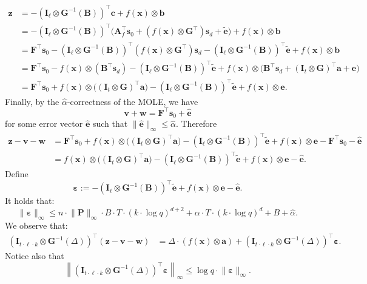 \documentclass{article}
\newcommand{\id}{\ensuremath{\mathbf{I}}}
\begin{document}
\begin{align*}
\mathbf{z}
&=-(\id_\ell\otimes \mathbf{G}^{-1}(\mathbf{B}))^\intercal \mathbf{c}+f(\mathbf{x})\otimes \mathbf{b}\\
&=-(\id_\ell\otimes \mathbf{G}^{-1}(\mathbf{B}))^\intercal
\bigl(\mathbf{A}_f^\intercal \mathbf{s}_0+(f(\mathbf{x})\otimes \mathbf{G}^\intercal)\mathbf{s}_d+\widetilde{\mathbf e}\bigr)
+f(\mathbf{x})\otimes \mathbf{b}\\
&=\mathbf{F}^\intercal \mathbf{s}_0
-(\id_\ell\otimes \mathbf{G}^{-1}(\mathbf{B}))^\intercal (f(\mathbf{x})\otimes \mathbf{G}^\intercal)\mathbf{s}_d
-(\id_\ell\otimes \mathbf{G}^{-1}(\mathbf{B}))^\intercal \widetilde{\mathbf e}
+f(\mathbf{x})\otimes \mathbf{b}\\
&=\mathbf{F}^\intercal \mathbf{s}_0
-f(\mathbf{x})\otimes (\mathbf{B}^\intercal \mathbf{s}_d)
-(\id_\ell\otimes \mathbf{G}^{-1}(\mathbf{B}))^\intercal \widetilde{\mathbf e}
+f(\mathbf{x})\otimes
\bigl(\mathbf{B}^\intercal \mathbf{s}_d+(\id_t\otimes \mathbf{G})^\intercal\mathbf{a}+\mathbf e\bigr)\\
&=\mathbf{F}^\intercal \mathbf{s}_0
+f(\mathbf{x})\otimes\bigl((\id_t\otimes \mathbf{G})^\intercal\mathbf a\bigr)
-(\id_\ell\otimes \mathbf{G}^{-1}(\mathbf{B}))^\intercal \widetilde{\mathbf e}
+f(\mathbf{x})\otimes \mathbf e.
\end{align*}
    Finally, by the $\hat{\alpha}$-correctness of the MOLE, we have
\[
\mathbf{v}+\mathbf{w}=\mathbf{F}^\intercal\mathbf{s}_0+\widehat{\mathbf e}
\]
for some error vector $\widehat{\mathbf e}$ such that $\lVert \widehat{\mathbf e}\rVert_\infty\le \hat{\alpha}$. Therefore
\begin{align*}
\mathbf{z}-\mathbf{v}-\mathbf{w}
&=\mathbf{F}^\intercal \mathbf{s}_0
+f(\mathbf{x})\otimes\bigl((\id_t\otimes \mathbf{G})^\intercal\mathbf a\bigr)
-(\id_\ell\otimes \mathbf{G}^{-1}(\mathbf{B}))^\intercal \widetilde{\mathbf e}
+f(\mathbf{x})\otimes \mathbf e
-\mathbf{F}^\intercal\mathbf{s}_0-\widehat{\mathbf e}\\
&=f(\mathbf{x})\otimes\bigl((\id_t\otimes \mathbf{G})^\intercal\mathbf a\bigr)
-(\id_\ell\otimes \mathbf{G}^{-1}(\mathbf{B}))^\intercal \widetilde{\mathbf e}
+f(\mathbf{x})\otimes \mathbf e
-\widehat{\mathbf e}.
\end{align*}
Define
\[
\bm\varepsilon:=-(\id_\ell\otimes \mathbf{G}^{-1}(\mathbf{B}))^\intercal \widetilde{\mathbf e}
+f(\mathbf{x})\otimes \mathbf e
-\widehat{\mathbf e}.
\] It holds that:
    \[\lVert\bm{\varepsilon}\rVert_\infty\le n\cdot \lVert \mathbf{P}\rVert_\infty\cdot B\cdot T\cdot (k\cdot \log q)^{d+2}+\alpha\cdot T\cdot (k\cdot \log q)^{d}+B+\hat{\alpha}.\]
    We observe that:
    \begin{align*}
(\id_{t\cdot \ell\cdot k}\otimes \mathbf{G}^{-1}(\Delta))^\intercal(\mathbf{z}-\mathbf{v}-\mathbf{w})
&=\Delta\cdot (f(\mathbf{x})\otimes \mathbf a)
+(\id_{t\cdot \ell\cdot k}\otimes \mathbf{G}^{-1}(\Delta))^\intercal\bm\varepsilon.
\end{align*}
Notice also that
\[
\left\lVert(\id_{t\cdot \ell\cdot k}\otimes \mathbf{G}^{-1}(\Delta))^\intercal\bm\varepsilon\right\rVert_\infty
\le \log q\cdot \lVert\bm\varepsilon\rVert_\infty.
\]
\end{document}
